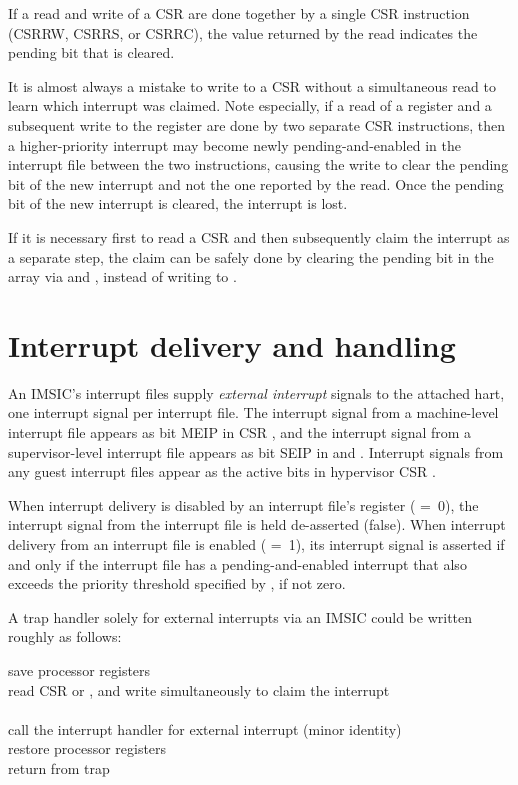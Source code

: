 If a read and write of a  CSR are done together by a single
CSR instruction (CSRRW, CSRRS, or CSRRC), the value returned by the
read indicates the pending bit that is cleared.

\begin{commentary}
It is almost always a mistake to write to a  CSR without a
simultaneous read to learn which interrupt was claimed.
Note especially, if a read of a  register and a subsequent
write to the register are done by two separate CSR instructions, then
a higher-priority interrupt may become newly pending-and-enabled in the
interrupt file between the two instructions, causing the write to clear
the pending bit of the new interrupt and not the one reported by the
read.
Once the pending bit of the new interrupt is cleared, the interrupt is
lost.

If it is necessary first to read a  CSR and then subsequently
claim the interrupt as a separate step, the claim can be safely done by
clearing the pending bit in the  array
via  and ,
instead of writing to .
\end{commentary}

\section{Interrupt delivery and handling}

An IMSIC's interrupt files supply \emph{external interrupt} signals to
the attached hart, one interrupt signal per interrupt file.
The interrupt signal from a machine-level interrupt file appears as bit
MEIP in CSR , and the interrupt signal from a supervisor-level
interrupt file appears as bit SEIP in  and .
Interrupt signals from any guest interrupt files appear as the active
bits in hypervisor CSR .

When interrupt delivery is disabled by an interrupt file's
 register ( =~0), the interrupt signal from
the interrupt file is held de-asserted (false).
When interrupt delivery from an interrupt file is enabled
( =~1), its interrupt signal is asserted if and only
if the interrupt file has a pending-and-enabled interrupt that also
exceeds the priority threshold specified by , if not
zero.

A trap handler solely for external interrupts via an IMSIC could be
written roughly as follows:
\begin{displayLinesTable}
save processor registers \\
read CSR  or , and write simultaneously to
 claim the interrupt \\
 \\
call the interrupt handler for external interrupt  (minor identity) \\
restore processor registers \\
return from trap \\
\end{displayLinesTable}

